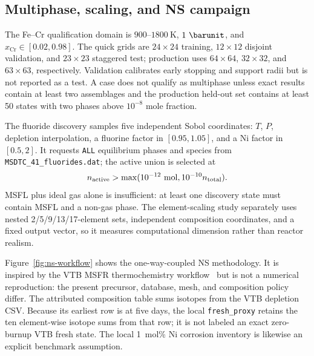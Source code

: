 \documentclass[11pt]{article}
\newcommand{\code}[1]{\texttt{#1}}
\begin{document}
\subsection{Multiphase, scaling, and NS campaign}

The Fe--Cr qualification domain is \(900\)--\(1800~\si{\kelvin}\), \(1~\si{\barunit}\), and
\(x_{\mathrm{Cr}}\in[0.02,0.98]\).  The quick grids are \(24\times24\) training,
\(12\times12\) disjoint validation, and \(23\times23\) staggered test; production uses
\(64\times64\), \(32\times32\), and \(63\times63\), respectively.  Validation calibrates early
stopping and support radii but is not reported as a test.  A case does not qualify as multiphase
unless exact results contain at least two assemblages and the production held-out set contains at
least 50 states with two phases above \(10^{-8}\) mole fraction.

The fluoride discovery samples five independent Sobol coordinates: \(T\), \(P\), depletion
interpolation, a fluorine factor in \([0.95,1.05]\), and a Ni factor in \([0.5,2]\).  It requests
\code{ALL} equilibrium phases and species from \code{MSDTC\_41\_fluorides.dat}; the active union is
selected at
\begin{equation}
  n_{\mathrm{active}}>\max(10^{-12}\ {\rm mol},10^{-10}n_{\mathrm{total}}).
\end{equation}
MSFL plus ideal gas alone is insufficient: at least one discovery state must contain MSFL and a
non-gas phase.  The element-scaling study separately uses nested 2/5/9/13/17-element sets,
independent composition coordinates, and a fixed output vector, so it measures computational
dimension rather than reactor realism.

Figure~\ref{fig:ns-workflow} shows the one-way-coupled NS methodology.  It is inspired by the VTB
MSFR thermochemistry workflow~\cite{vtbthermo} but is not a numerical reproduction: the present
precursor, database, mesh, and composition policy differ.  The attributed composition table sums
isotopes from the VTB depletion CSV.  Because its earliest row is at five days, the local
\code{fresh\_proxy} retains the ten element-wise isotope sums from that row; it is not labeled an
exact zero-burnup VTB fresh state.  The local 1~mol\% Ni corrosion inventory is likewise an explicit benchmark
assumption.
\end{document}
